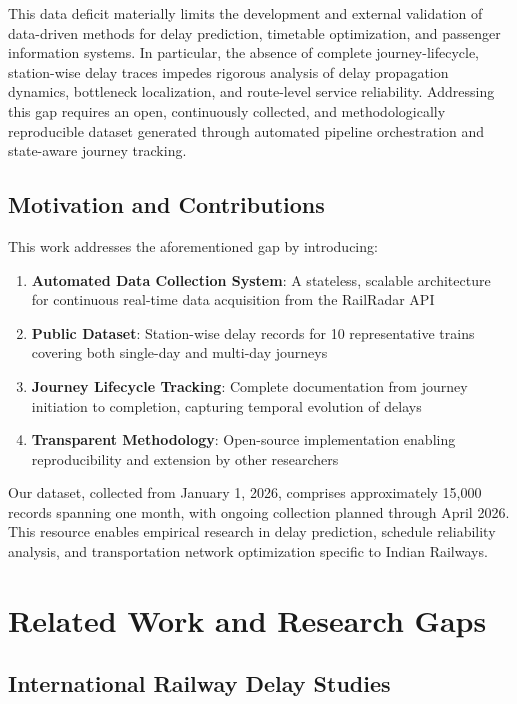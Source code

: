 \documentclass[conference]{IEEEtran}
\begin{document}
This data deficit materially limits the development and external validation of data-driven methods for delay prediction, timetable optimization, and passenger information systems. In particular, the absence of complete journey-lifecycle, station-wise delay traces impedes rigorous analysis of delay propagation dynamics, bottleneck localization, and route-level service reliability. Addressing this gap requires an open, continuously collected, and methodologically reproducible dataset generated through automated pipeline orchestration and state-aware journey tracking.

\subsection{Motivation and Contributions}

This work addresses the aforementioned gap by introducing:

\begin{enumerate}
    \item \textbf{Automated Data Collection System}: A stateless, scalable architecture for continuous real-time data acquisition from the RailRadar API
    \item \textbf{Public Dataset}: Station-wise delay records for 10 representative trains covering both single-day and multi-day journeys
    \item \textbf{Journey Lifecycle Tracking}: Complete documentation from journey initiation to completion, capturing temporal evolution of delays
    \item \textbf{Transparent Methodology}: Open-source implementation enabling reproducibility and extension by other researchers
\end{enumerate}

Our dataset, collected from January 1, 2026, comprises approximately 15,000 records spanning one month, with ongoing collection planned through April 2026. This resource enables empirical research in delay prediction, schedule reliability analysis, and transportation network optimization specific to Indian Railways.

\section{Related Work and Research Gaps}

\subsection{International Railway Delay Studies}
\end{document}

